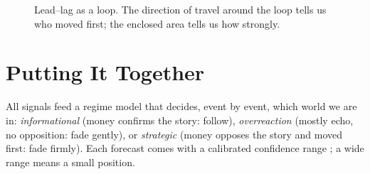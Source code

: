 \documentclass[11pt,a4paper]{article}
\begin{document}
\begin{figure}[ht]
\caption{Lead--lag as a loop. The direction of travel around the loop tells us who moved first; the enclosed area tells us how strongly.}
\label{fig:loop}
\end{figure}

\section{Putting It Together}

All signals feed a regime model that decides, event by event, which world we are in: \emph{informational} (money confirms the story: follow), \emph{overreaction} (mostly echo, no opposition: fade gently), or \emph{strategic} (money opposes the story and moved first: fade firmly). Each forecast comes with a calibrated confidence range \citep{gibbs2021}; a wide range means a small position.
\end{document}
